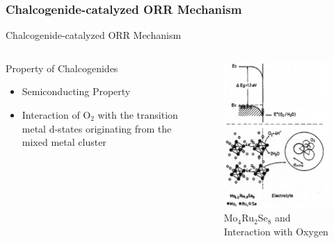 \documentclass{beamer}
\begin{document}
\subsubsection{Chalcogenide-catalyzed ORR Mechanism}
\begin{frame}{Chalcogenide-catalyzed ORR Mechanism}
     \begin{columns}[c] %
     \begin{column}[c]{5cm} %
     \begin{block}{Property of Chalcogenides}
     
\begin{itemize}
\item{Semiconducting Property}
\item{Interaction of O$_2$ with the transition metal d-states originating from the mixed metal cluster}
\end{itemize}
\end{block}

     \end{column}
     \begin{column}[c]{5cm} %
    
    
    \begin{figure}[htbp]
    \begin{center}
    \includegraphics[scale=0.6]{image7}
    \caption{Mo$_4$Ru$_2$Se$_8$ and Interaction with Oxygen}
    \end{center}
\end{figure}


     \end{column}
     \end{columns}
\end{frame}
\end{document}
